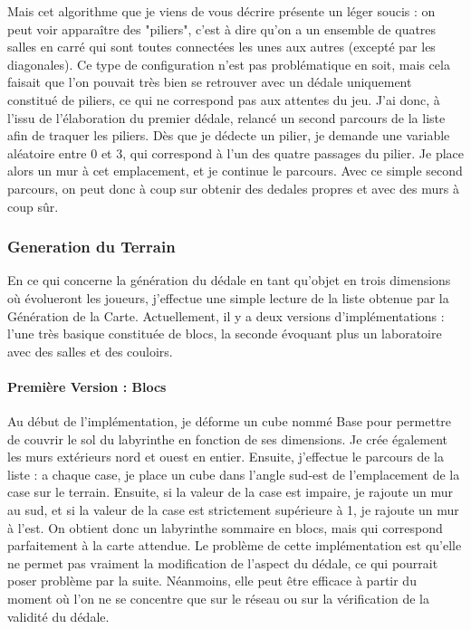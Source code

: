 \documentclass{article}
\begin{document}
Mais cet algorithme que je viens de vous décrire présente un léger soucis : on peut voir apparaître des "piliers", c'est à dire qu'on a un ensemble de quatres salles en carré qui sont toutes connectées les unes aux autres (excepté par les diagonales). Ce type de configuration n'est pas problématique en soit, mais cela faisait que l'on pouvait très bien se retrouver avec un dédale uniquement constitué de piliers, ce qui ne correspond pas aux attentes du jeu. J'ai donc, à l'issu de l'élaboration du premier dédale, relancé un second parcours de la liste afin de traquer les piliers. Dès que je dédecte un pilier, je demande une variable aléatoire entre 0 et 3, qui correspond à l'un des quatre passages du pilier. Je place alors un mur à cet emplacement, et je continue le parcours. Avec ce simple second parcours, on peut donc à coup sur obtenir des dedales propres et avec des murs à coup sûr.

\subsubsection{Generation du Terrain}
En ce qui concerne la génération du dédale en tant qu'objet en trois dimensions où évolueront les joueurs, j'effectue une simple lecture de la liste obtenue par la Génération de la Carte. Actuellement, il y a deux versions d'implémentations : l'une très basique constituée de blocs, la seconde évoquant plus un laboratoire avec des salles et des couloirs.

\paragraph{Première Version : Blocs}
Au début de l'implémentation, je déforme un cube nommé Base pour permettre de couvrir le sol du labyrinthe en fonction de ses dimensions. Je crée également les murs extérieurs nord et ouest en entier. Ensuite, j'effectue le parcours de la liste : a chaque case, je place un cube dans l'angle sud-est de l'emplacement de la case sur le terrain. Ensuite, si la valeur de la case est impaire, je rajoute un mur au sud, et si la valeur de la case est strictement supérieure à 1, je rajoute un mur à l'est. On obtient donc un labyrinthe sommaire en blocs, mais qui correspond parfaitement à la carte attendue. Le problème de cette implémentation est qu'elle ne permet pas vraiment la modification de l'aspect du dédale, ce qui pourrait poser problème par la suite. Néanmoins, elle peut être efficace à partir du moment où l'on ne se concentre que sur le réseau ou sur la vérification de la validité du dédale.
\end{document}
